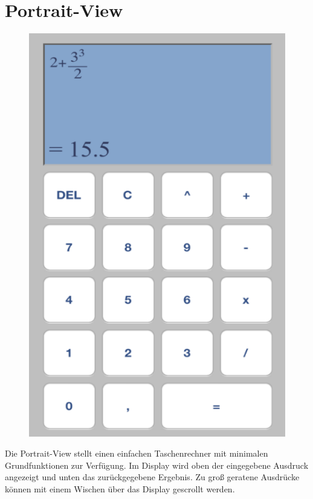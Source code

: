 \section{Portrait-View}
\begin{figure}[H]
	\centering
	\includegraphics[height=.5\textheight]{portrait.png}
\end{figure}
Die Portrait-View stellt einen einfachen Taschenrechner mit minimalen Grundfunktionen zur Verfügung. Im Display wird oben der eingegebene Ausdruck angezeigt und unten das zurückgegebene Ergebnis.
Zu groß geratene Ausdrücke können mit einem Wischen über das Display gescrollt werden.

